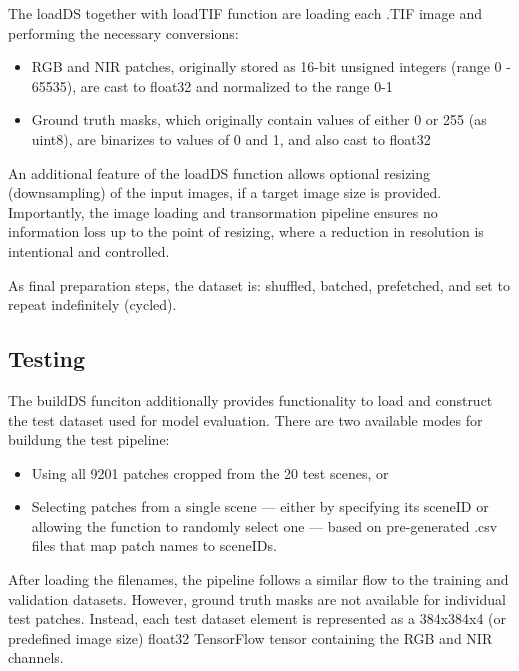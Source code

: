 {The loadDS together with loadTIF function are loading each .TIF image and performing the necessary conversions:

\begin{itemize}
    \item RGB and NIR patches, originally stored as 16-bit unsigned integers (range 0 - 65535), are cast to float32 and normalized to the range 0-1
    \item Ground truth masks, which originally contain values of either 0 or 255 (as uint8), are binarizes to values of 0 and 1, and also cast to float32
\end{itemize}

An additional feature of the loadDS function allows optional resizing (downsampling) of the input images, if a target image size is provided. Importantly, the image loading and transormation pipeline ensures no information loss up to the point of resizing, where a reduction in resolution is intentional and controlled.

As final preparation steps, the dataset is: shuffled, batched, prefetched, and set to repeat indefinitely (cycled).


\subsection{Testing}
\label{subsec:testing}

The buildDS funciton additionally provides functionality to load and construct the test dataset used for model evaluation. There are two available modes for buildung the test pipeline:

\begin{itemize}
    \item Using all 9201 patches cropped from the 20 test scenes, or
    \item Selecting patches from a single scene --- either by specifying its sceneID or allowing the function to randomly select one --- based on pre-generated .csv files that map patch names to sceneIDs.
\end{itemize}

After loading the filenames, the pipeline follows a similar flow to the training and validation datasets. However, ground truth masks are not available for individual test patches. Instead, each test dataset element is represented as a 384x384x4 (or predefined image size) float32 TensorFlow tensor containing the RGB and NIR channels.

}
